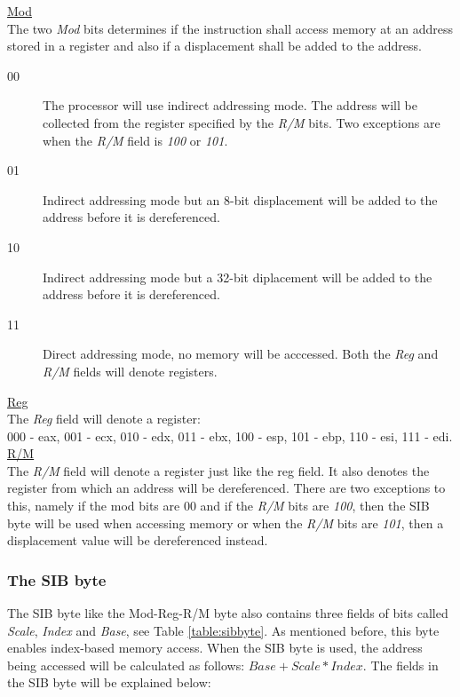 \documentclass[11pt,twoside]{eitExjobb}
\begin{document}
\noindent \uline{Mod}\\
The two \emph{Mod} bits determines if the instruction shall access memory at an address stored in a register and also if a displacement shall be added to the address.\\
\begin{description}
\item[00] The processor will use indirect addressing mode. The address will be collected from the register specified by the \emph{R/M} bits. Two exceptions are when the \emph{R/M} field is \emph{100} or \emph{101}.  
\item[01] Indirect addressing mode but an 8-bit displacement will be added to the address before it is dereferenced.
\item[10] Indirect addressing mode but a 32-bit diplacement will be added to the address before it is dereferenced.
\item[11] Direct addressing mode, no memory will be acccessed. Both the \emph{Reg} and \emph{R/M} fields will denote registers.
\end{description}

\noindent \uline{Reg}\\
The \emph{Reg} field will denote a register: \\ 000 - eax, 001 - ecx, 010 - edx, 011 - ebx, 100 - esp, 101 - ebp, 110 - esi, 111 - edi.\\


\noindent \uline{R/M}\\
The \emph{R/M} field will denote a register just like the reg field. It also denotes the register from which an address will be dereferenced. There are two exceptions to this, namely if the mod bits are 00 and if the \emph{R/M} bits are \emph{100}, then the SIB byte will be used when accessing memory or when the \emph{R/M} bits are \emph{101}, then a displacement value will be dereferenced instead.

\subsubsection{The SIB byte}
The SIB byte like the Mod-Reg-R/M byte also contains three fields of bits called \emph{Scale}, \emph{Index} and \emph{Base}, see Table \ref{table:sibbyte}. As mentioned before, this byte enables index-based memory access. When the SIB byte is used, the address being accessed will be calculated as follows:
$Base + Scale*Index$. The fields in the SIB byte will be explained below:\\
\end{document}
